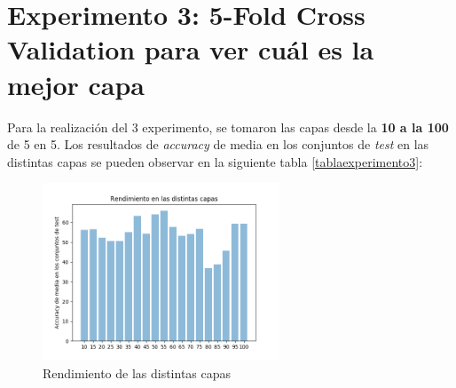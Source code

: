 \section{Experimento 3:  5-Fold Cross Validation para ver cuál es la mejor capa}
\label{experimento3-resultados}
Para la realización del 3 experimento, se tomaron las capas desde la \textbf{10 a la 100} de 5 en 5. Los resultados de \textit{accuracy} de media en los conjuntos de \textit{test} en las distintas capas se pueden observar en la siguiente tabla \ref{tablaexperimento3}:\\
\begin{figure}[H]
	\label{figure1}
	\caption{Rendimiento de las distintas capas}
	\centering
	\includegraphics[height=200px,width=\textwidth]{imagenes/experimento3.png}
\end{figure}
\newpage

